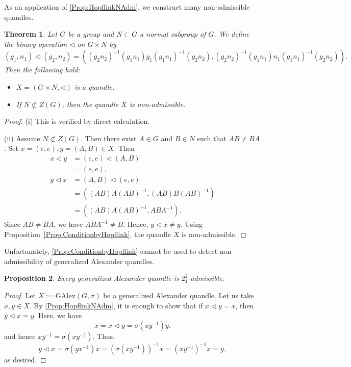 \documentclass[12pt]{article}
\theoremstyle{plain}
\newtheorem{thm}{Theorem}[section]
\newtheorem{prop}[thm]{Proposition}
\theoremstyle{definition}
\newcommand{\qop}{\triangleleft}
\newcommand{\GAlex}{\mathrm{GAlex}}
\begin{document}
As an application of \cref{Prop:HopflinkNAdm}, we construct many non-admissible quandles.

\begin{thm}
  Let $G$ be a group and
  $N \subset G$ a normal subgroup of $G$.
  We define the binary operation $\qop$ on $G \times N$ by 
  \[(g_{1}, n_{1}) \qop (g_{2}, n_{2}) = ((g_{2} n_{2})^{-1} (g_{1} n_{1}) g_{1} (g_{1} n_{1})^{-1} (g_{2} n_{2}), (g_{2} n_{2})^{-1} (g_{1} n_{1}) n_{1} (g_{1} n_{1})^{-1} (g_{2} n_{2})).\]
  Then the following hold:
  \begin{itemize}
    \item[(i)] $X = (G \times N, \qop)$ is a quandle.
    \item[(ii)] If $N \not\subset Z(G)$, then the quandle $X$ is non-admissible.
  \end{itemize}
  \label{Thm:Hopflink}
\end{thm}
\begin{proof}
  (i) This is verified by direct calculation.

  (ii) Assume $N \not\subset Z(G)$.
  Then there exist $A \in G$ and $B \in N$ such that $AB \neq BA$.
  Set $x = (e,e), y = (A, B) \in X$.
  Then
  \begin{align*}
    x \qop y & = (e,e) \qop (A, B) \\
    & = (e,e),\\
    y \qop x & = (A, B) \qop (e,e) \\
    & = ((AB)A(AB)^{-1}, (AB)B(AB)^{-1})\\
    & = ((AB)A(AB)^{-1}, ABA^{-1}).
  \end{align*}
  Since $AB \neq BA$, we have $ABA^{-1} \neq B$.
  Hence, $y \qop x \neq y.$
  Using Proposition~\ref{Prop:ConditionbyHopflink},
  the quandle $X$ is non-admissible.
\end{proof}


Unfortunately, \cref{Prop:ConditionbyHopflink} 
cannot be used to detect non-admissibility of
generalized Alexander quandles.

\begin{prop}
    Every generalized Alexander quandle is $2_{1}^{2}$-admissible.
    \label{Prop:Hopf_vs_GAlex}
\end{prop}
\begin{proof}
    Let $X := \GAlex(G, \sigma)$ be a generalized Alexander quandle.
    Let us take $x, y \in X$.
    By \cref{Prop:HopflinkNAdm},
    it is enough to show that if $x \qop y = x$, then $y \qop x = y$.
    Here, we have 
    \[
        x = x \qop y = \sigma(xy^{-1})y.
    \]
    and hence $x y^{-1} = \sigma(xy^{-1})$.
    Thus, 
    \[
        y \qop x = \sigma(yx^{-1}) x = (\sigma(xy^{-1}))^{-1} x = (xy^{-1})^{-1}x = y,
    \]
    as desired.
\end{proof}
\end{document}
